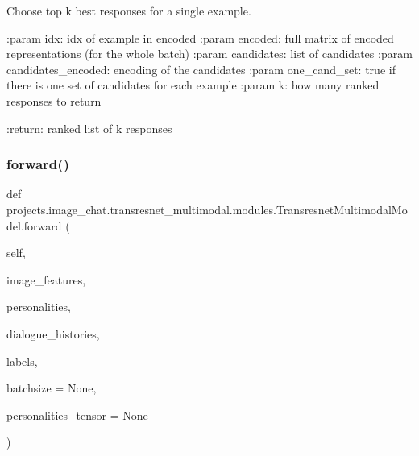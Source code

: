 \begin{DoxyVerb}Choose top k best responses for a single example.

:param idx:
    idx of example in encoded
:param encoded:
    full matrix of encoded representations (for the whole batch)
:param candidates:
    list of candidates
:param candidates_encoded:
    encoding of the candidates
:param one_cand_set:
    true if there is one set of candidates for each example
:param k:
    how many ranked responses to return

:return:
    ranked list of k responses
\end{DoxyVerb}
 \mbox{\label{classprojects_1_1image__chat_1_1transresnet__multimodal_1_1modules_1_1TransresnetMultimodalModel_a9e5dd2a418ccbbe70d1b7f8ae3be78ed}} 
\subsubsection{\texorpdfstring{forward()}{forward()}}
{\footnotesize\ttfamily def projects.\+image\+\_\+chat.\+transresnet\+\_\+multimodal.\+modules.\+Transresnet\+Multimodal\+Model.\+forward (\begin{DoxyParamCaption}\item[{}]{self,  }\item[{}]{image\+\_\+features,  }\item[{}]{personalities,  }\item[{}]{dialogue\+\_\+histories,  }\item[{}]{labels,  }\item[{}]{batchsize = {\ttfamily None},  }\item[{}]{personalities\+\_\+tensor = {\ttfamily None} }\end{DoxyParamCaption})}

